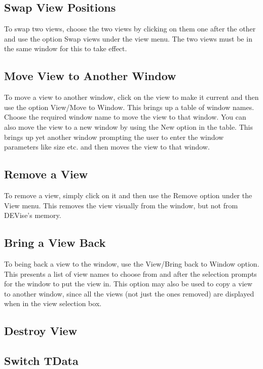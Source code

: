 \subsection{Swap View Positions}

To swap two views, choose the two views by clicking on them one after
the other and use the option Swap views under the view menu. The two
views must be in the same window for this to take effect.

\subsection{Move View to Another Window}

To move a view to another window, click on the view to make it current
and then use the option View/Move to Window. This brings up a table of
window names. Choose the required window name to move the view to that
window. You can also move the view to a new window by using the New
option in the table. This brings up yet another window prompting the
user to enter the window parameters like size etc. and then moves the
view to that window.

\subsection{Remove a View}

To remove a view, simply click on it and then use the Remove option
under the View menu. This removes the view visually from the window,
but not from DEVise's memory.

\subsection{Bring a View Back}

To being back a view to the window, use the View/Bring back to Window
option. This presents a list of view names to choose from and after
the selection prompts for the window to put the view in. This option
may also be used to copy a view to another window, since all the views
(not just the ones removed) are displayed when in the view selection
box.

\subsection{Destroy View}


\subsection{Switch TData}

